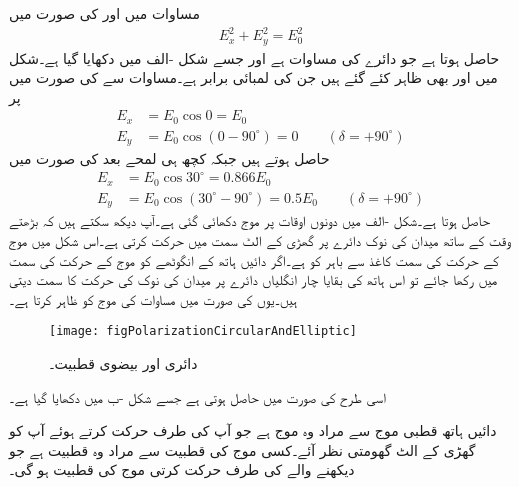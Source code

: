 مساوات  میں  اور  کی صورت میں
\begin{align}\label{مساوات_قطبیت_عمومی_دائری_قطبیت}
E_x^2 +E_y^2=E_{0}^2
\end{align}
حاصل ہوتا ہے جو دائرے کی مساوات ہے اور جسے شکل -الف میں دکھایا گیا ہے۔شکل میں  اور  بھی ظاہر کئے گئے ہیں جن کی لمبائی برابر ہے۔مساوات  سے  کی صورت میں  پر 
\begin{align*}
E_x&=E_{0} \cos 0=E_{0}\\  
E_y&=E_{0} \cos (0  -90^\circ) =0  \quad \quad (\delta =+90^\circ)
\end{align*}
حاصل ہوتے ہیں جبکہ کچھ ہی لمحے بعد  کی صورت میں
\begin{align*}
E_x&=E_{0} \cos 30^\circ=0.866 E_{0} \\
E_y&=E_{0} \cos (30^\circ  -90^\circ) =0.5 E_{0} \quad \quad (\delta =+90^\circ)
\end{align*}
حاصل ہوتا ہے۔شکل -الف میں دونوں اوقات پر موج دکھائی گئی ہے۔آپ دیکھ سکتے ہیں کہ بڑھتے وقت کے ساتھ میدان کی نوک دائرے پر گھڑی کے الٹ سمت میں حرکت کرتی ہے۔اس شکل میں موج کے حرکت کی سمت  کاغذ سے باہر کو ہے۔اگر دائیں ہاتھ کے انگوٹھے کو موج کے حرکت کی سمت میں رکھا جائے تو اس ہاتھ کی بقایا چار انگلیاں دائرے پر میدان کی نوک کی حرکت کا سمت دیتی ہیں۔یوں  کی صورت میں مساوات   کی موج کو ظاہر کرتا ہے۔   
\begin{figure}
\centering
\texttt{[image: figPolarizationCircularAndElliptic]}
\caption{دائری اور بیضوی قطبیت۔}
\label{شکل_قطبیت_دائری_اور_بیضوی_قطبیت}
\end{figure}

اسی طرح  کی صورت میں  حاصل ہوتی ہے جسے شکل -ب میں دکھایا گیا ہے۔

دائیں ہاتھ قطبی موج سے مراد وہ موج ہے جو آپ کی طرف حرکت کرتے ہوئے آپ کو گھڑی کے الٹ گھومتی نظر آئے۔کسی موج کی قطبیت سے مراد وہ قطبیت ہے جو دیکھنے والے کی طرف حرکت کرتی موج کی قطبیت ہو گی۔

